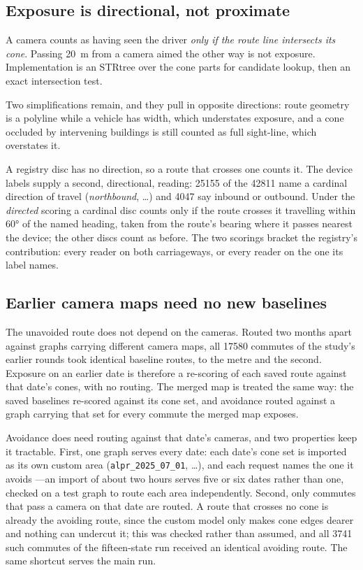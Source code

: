 \documentclass[11pt,twoside]{article}
\begin{document}
\subsection{Exposure is directional, not proximate}
\label{sec:method:exposure}

A camera counts as having seen the driver \emph{only if the route line intersects its
cone}. Passing \SI{20}{\metre} from a camera aimed the other way is not exposure.
Implementation is an STRtree over the cone parts for candidate lookup, then an exact
intersection test.

Two simplifications remain, and they pull in opposite directions: route geometry is a
polyline while a vehicle has width, which understates exposure, and a cone occluded by
intervening buildings is still counted as full sight-line, which overstates it.

A registry disc has no direction, so a route that crosses one counts it. The device labels
supply a second, directional, reading: \num{25155} of the \num{42811} name a cardinal
direction of travel (\emph{northbound}, \ldots) and \num{4047} say inbound or outbound. Under
the \emph{directed} scoring a cardinal disc counts only if the route crosses it travelling
within \ang{60} of the named heading, taken from the route's bearing where it passes nearest
the device; the other discs count as before. The two scorings bracket the registry's
contribution: every reader on both carriageways, or every reader on the one its label names.

\subsection{Earlier camera maps need no new baselines}
\label{sec:method:history}

The unavoided route does not depend on the cameras. Routed two months apart against graphs
carrying different camera maps, all \num{17580} commutes of the study's earlier rounds took
identical baseline routes, to the metre and the second. Exposure on an earlier date is
therefore a re-scoring of each saved route against that date's cones, with no routing. The
merged map is treated the same way: the saved baselines re-scored against its cone set, and
avoidance routed against a graph carrying that set for every commute the merged map exposes.

Avoidance does need routing against that date's cameras, and two properties keep it
tractable. First, one graph serves every date: each date's cone set is imported as its own
custom area (\texttt{alpr\_2025\_07\_01}, \ldots), and each request names the one it avoids
---an import of about two hours serves five or six dates rather than one, checked on a test
graph to route each area independently. Second, only commutes that pass a camera on that date are
routed. A route that crosses no cone is already the avoiding route, since the custom model
only makes cone edges dearer and nothing can undercut it; this was checked rather than
assumed, and all \num{3741} such commutes of the fifteen-state run received an identical
avoiding route. The same shortcut serves the main run.
\end{document}
